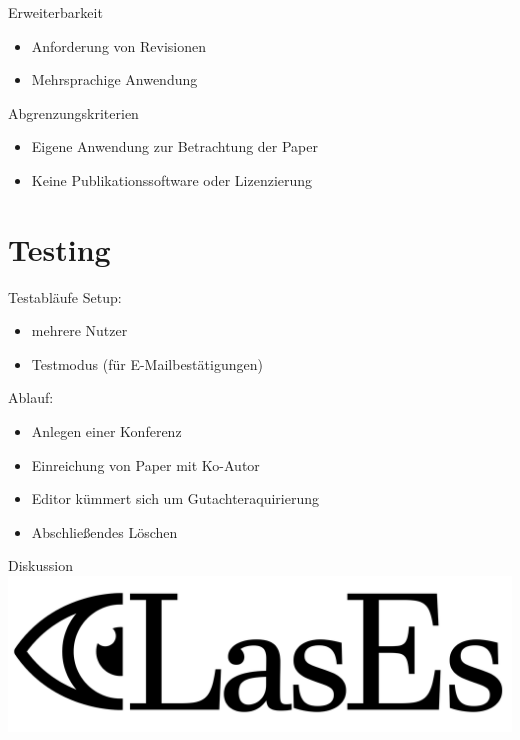 \documentclass{beamer}
\begin{document}
\begin{frame}{Erweiterbarkeit}
	\pause
	\begin{itemize}
		\item Anforderung von Revisionen
		\pause
		\item Mehrsprachige Anwendung
	\end{itemize}
\end{frame}

\begin{frame}{Abgrenzungskriterien}
	\pause
	\begin{itemize}
		\item Eigene Anwendung zur Betrachtung der Paper
		\pause
		\item Keine Publikationssoftware oder Lizenzierung
	\end{itemize}
\end{frame}

\section{Testing}
\begin{frame}{Testabläufe}
	\pause
	Setup:
	\begin{itemize}
		\item mehrere Nutzer
		\item Testmodus (für E-Mailbestätigungen)
	\end{itemize}

	\pause

	Ablauf:
	\begin{itemize}
		\item Anlegen einer Konferenz
		\item Einreichung von Paper mit Ko-Autor
		\item Editor kümmert sich um Gutachteraquirierung
		\item Abschließendes Löschen
	\end{itemize}
\end{frame}

\begin{frame}{Diskussion}
	\centering
	\includegraphics[width=0.7\linewidth]{../../docs/Pflichtenheft/graphics/LasEs-logo}
\end{frame}
\end{document}
